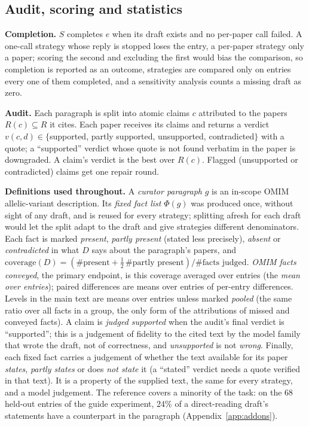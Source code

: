 \documentclass{article} %
\begin{document}
\subsection{Audit, scoring and statistics}
\label{sec:scoring}
\textbf{Completion.} $S$ completes $e$ when its draft exists and no per-paper call failed. A one-call strategy whose reply is stopped loses the entry, a per-paper strategy only a paper; scoring the second and excluding the first would bias the comparison, so completion is reported as an outcome, strategies are compared only on entries every one of them completed, and a sensitivity analysis counts a missing draft as zero.

\textbf{Audit.} Each paragraph is split into atomic claims $c$ attributed to the papers $R(c)\subseteq R$ it cites. Each paper receives its claims and returns a verdict $v(c,d)\in\{$supported, partly supported, unsupported, contradicted$\}$ with a quote; a ``supported'' verdict whose quote is not found verbatim in the paper is downgraded. A claim's verdict is the best over $R(c)$. Flagged (unsupported or contradicted) claims get one repair round.

\textbf{Definitions used throughout.} A \emph{curator paragraph} $g$ is an in-scope OMIM allelic-variant description. Its \emph{fixed fact list} $\Phi(g)$ was produced once, without sight of any draft, and is reused for every strategy; splitting afresh for each draft would let the split adapt to the draft and give strategies different denominators. Each fact is marked \emph{present}, \emph{partly present} (stated less precisely), \emph{absent} or \emph{contradicted} in what $D$ says about the paragraph's papers, and $\text{coverage}(D)=(\#\text{present}+\tfrac12\,\#\text{partly present})/\#\text{facts judged}$. \emph{OMIM facts conveyed}, the primary endpoint, is this coverage averaged over entries (the \emph{mean over entries}); paired differences are means over entries of per-entry differences. Levels in the main text are means over entries unless marked \emph{pooled} (the same ratio over all facts in a group, the only form of the attributions of missed and conveyed facts). A claim is \emph{judged supported} when the audit's final verdict is ``supported''; this is a judgement of fidelity to the cited text by the model family that wrote the draft, not of correctness, and \emph{unsupported} is not \emph{wrong}. Finally, each fixed fact carries a judgement of whether the text available for its paper \emph{states}, \emph{partly states} or does \emph{not state} it (a ``stated'' verdict needs a quote verified in that text). It is a property of the supplied text, the same for every strategy, and a model judgement. The reference covers a minority of the task: on the 68 held-out entries of the guide experiment, 24\% of a direct-reading draft's statements have a counterpart in the paragraph (Appendix~\ref{app:addons}).
\end{document}
